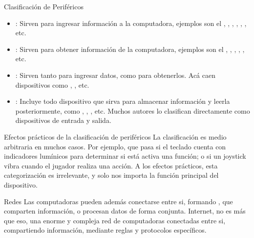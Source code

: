\begin{frame}[shrink]{Clasificación de Periféricos}
  \begin{itemize}
    \item {}: Sirven para ingresar información a la computadora,
      ejemplos son el , , ,
      , , , etc.
    \item {}: Sirven para obtener información de la computadora,
      ejemplos son el , , ,
      , , etc.
    \item {}: Sirven tanto para ingresar datos, como para
      obtenerlos. Acá caen dispositivos como , 
      , etc.
    \item {}: Incluye todo dispositivo que sirva para almacenar
      información y leerla posteriormente, como ,
      , , etc. Muchos autores lo
      clasifican directamente como dispositivos de entrada y salida.
  \end{itemize}
\end{frame}


\begin{frame}[shrink]{Efectos prácticos de la clasificación de periféricos}
  La clasificación es medio arbitraria en muchos casos. Por ejemplo, que pasa si
  el teclado cuenta con indicadores lumínicos para determinar si está activa una
  función; o si un joystick vibra cuando el jugador realiza una acción.
  \jump
  A los efectos prácticos, esta categorización es irrelevante, y solo nos
  importa la función principal del dispositivo.
\end{frame}


\begin{frame}{Redes}
  Las computadoras pueden además conectarse entre si, formando , que comparten información, o procesan datos de forma conjunta.
  \jump
  Internet, no es más que eso, una enorme y compleja red de computadoras
  conectadas entre si, compartiendo información, mediante reglas y protocolos
  específicos.
\end{frame}

